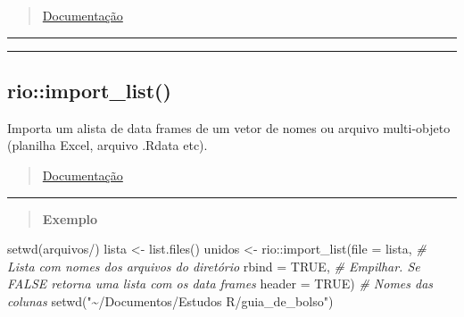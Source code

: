 \documentclass[
]{book}
\newenvironment{Shaded}{\begin{snugshade}}{\end{snugshade}}
\newcommand{\AttributeTok}[1]{\textcolor[rgb]{0.77,0.63,0.00}{#1}}
\newcommand{\CommentTok}[1]{\textcolor[rgb]{0.56,0.35,0.01}{\textit{#1}}}
\newcommand{\ConstantTok}[1]{\textcolor[rgb]{0.00,0.00,0.00}{#1}}
\newcommand{\FunctionTok}[1]{\textcolor[rgb]{0.00,0.00,0.00}{#1}}
\newcommand{\NormalTok}[1]{#1}
\newcommand{\OtherTok}[1]{\textcolor[rgb]{0.56,0.35,0.01}{#1}}
\newcommand{\SpecialCharTok}[1]{\textcolor[rgb]{0.00,0.00,0.00}{#1}}
\newcommand{\StringTok}[1]{\textcolor[rgb]{0.31,0.60,0.02}{#1}}
\theoremstyle{definition}
\theoremstyle{definition}
\theoremstyle{definition}
\theoremstyle{definition}
\theoremstyle{remark}
\begin{document}
\begin{quote}
\href{https://www.rdocumentation.org/packages/base/versions/3.6.2/topics/function}{Documentação}
\end{quote}

\begin{center}\rule{0.5\linewidth}{0.5pt}\end{center}

\begin{center}\rule{0.5\linewidth}{0.5pt}\end{center}

\hypertarget{rioimport_list}{%
\subsection{rio::import\_list()}\label{rioimport_list}}

Importa um alista de data frames de um vetor de nomes ou arquivo multi-objeto (planilha Excel, arquivo .Rdata etc).

\begin{quote}
\href{https://www.rdocumentation.org/packages/rio/versions/0.5.29/topics/import_list}{Documentação}
\end{quote}

\begin{center}\rule{0.5\linewidth}{0.5pt}\end{center}

\begin{quote}
\textbf{Exemplo}
\end{quote}

\begin{Shaded}
\begin{Highlighting}[]
\FunctionTok{setwd}\NormalTok{(}\StringTok{\textquotesingle{}arquivos/\textquotesingle{}}\NormalTok{)}
\NormalTok{lista }\OtherTok{\textless{}{-}} \FunctionTok{list.files}\NormalTok{()}
\NormalTok{unidos }\OtherTok{\textless{}{-}}\NormalTok{ rio}\SpecialCharTok{::}\FunctionTok{import\_list}\NormalTok{(}\AttributeTok{file =}\NormalTok{ lista, }\CommentTok{\# Lista com nomes dos arquivos do diretório}
                 \AttributeTok{rbind =} \ConstantTok{TRUE}\NormalTok{,    }\CommentTok{\# Empilhar. Se FALSE retorna uma lista com os data frames}
                 \AttributeTok{header =} \ConstantTok{TRUE}\NormalTok{)   }\CommentTok{\# Nomes das colunas}
\FunctionTok{setwd}\NormalTok{(}\StringTok{"\textasciitilde{}/Documentos/Estudos R/guia\_de\_bolso"}\NormalTok{)}
\end{Highlighting}
\end{Shaded}
\end{document}
